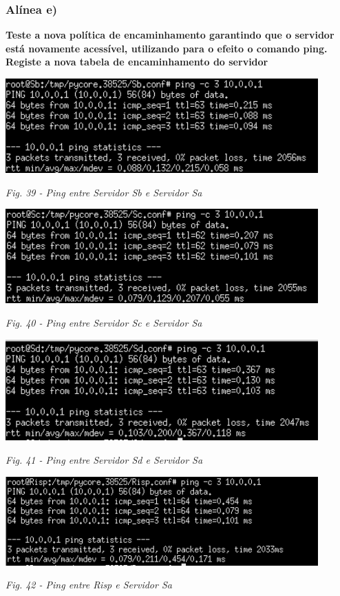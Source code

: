 \documentclass{article}
\begin{document}
\subsubsection{Alínea e)}
\textbf{Teste a nova política de encaminhamento garantindo que o servidor está novamente acessível, utilizando para o efeito o comando ping. Registe a nova tabela de encaminhamento do servidor}
\begin{center}
    \includegraphics[width = 12cm]{25.png}\par\caption{\textit{Fig. 39 - Ping entre Servidor Sb e Servidor Sa}}
\end{center}
\begin{center}
    \includegraphics[width = 12cm]{252.png}\par\caption{\textit{Fig. 40 - Ping entre Servidor Sc e Servidor Sa}}
\end{center}
\begin{center}
    \includegraphics[width = 12cm]{253.png}\par\caption{\textit{Fig. 41 - Ping entre Servidor Sd e Servidor Sa}}
\end{center}
\begin{center}
    \includegraphics[width = 12cm]{254.png}\par\caption{\textit{Fig. 42 - Ping entre Risp e Servidor Sa}}
\end{center}
\end{document}
